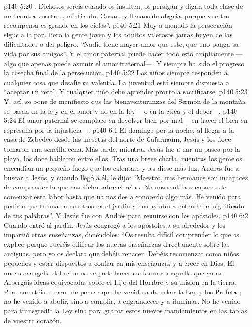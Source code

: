 \vs p140 5:20 . Dichosos seréis cuando os insulten, os persigan y digan toda clase de mal contra vosotros, mintiendo. Gozaos y llenaos de alegría, porque vuestra recompensa es grande en los cielos”.
\vs p140 5:21 Muy a menudo la persecución sigue a la paz. Pero la gente joven y los adultos valerosos jamás huyen de las dificultades o del peligro. “Nadie tiene mayor amor que este, que uno ponga su vida por sus amigos”. Y el amor paternal puede hacer todo esto ampliamente ---algo que apenas puede asumir el amor fraternal---. Y siempre ha sido el progreso la cosecha final de la persecución.
\vs p140 5:22 Los niños siempre responden a cualquier cosa que desafíe su valentía. La juventud está siempre dispuesta a “aceptar un reto”. Y cualquier niño debe aprender pronto a sacrificarse.
\vs p140 5:23 \pc Y, así, se pone de manifiesto que las bienaventuranzas del Sermón de la montaña se basan en la fe y en el amor y no en la ley ---o en la ética y el deber---.
\vs p140 5:24 \pc El amor paternal se complace en devolver bien por mal ---en hacer el bien en represalia por la injusticia---.
\vs p140 6:1 El domingo por la noche, al llegar a la casa de Zebedeo desde las mesetas del norte de Cafarnaúm, Jesús y los doce tomaron una sencilla cena. Más tarde, mientras Jesús fue a dar un paseo por la playa, los doce hablaron entre ellos. Tras una breve charla, mientras los gemelos encendían un pequeño fuego que los calentase y les diese más luz, Andrés fue a buscar a Jesús, y cuando llegó a él, le dijo: “Maestro, mis hermanos son incapaces de comprender lo que has dicho sobre el reino. No nos sentimos capaces de comenzar esta labor hasta que no nos des a conocerlo algo más. He venido para pedirte que te unas a nosotros en el jardín y nos ayudes a entender el significado de tus palabras”. Y Jesús fue con Andrés para reunirse con los apóstoles.
\vs p140 6:2 Cuando entró al jardín, Jesús congregó a los apóstoles a su alrededor y les impartió otras enseñanzas, diciéndoles: “Os resulta difícil comprender lo que os explico porque queréis edificar las nuevas enseñanzas directamente sobre las antiguas, pero yo os declaro que debéis renacer. Debéis recomenzar como niños pequeños y estar dispuestos a confiar en mis enseñanzas y a creer en Dios. El nuevo evangelio del reino no se pude hacer conformar a aquello que ya es. Albergáis ideas equivocadas sobre el Hijo del Hombre y su misión en la tierra. Pero cometéis el error de pensar que he venido a desechar la Ley y los Profetas; no he venido a abolir, sino a cumplir, a engrandecer y a iluminar. No he venido para transgredir la Ley sino para grabar estos nuevos mandamientos en las tablas de vuestro corazón.
